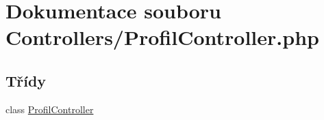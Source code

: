 \hypertarget{_profil_controller_8php}{\section{Dokumentace souboru Controllers/\-Profil\-Controller.php}
\label{_profil_controller_8php}
}
\subsection*{Třídy}
\begin{DoxyCompactItemize}
\item 
class \hyperlink{class_profil_controller}{Profil\-Controller}
\end{DoxyCompactItemize}
